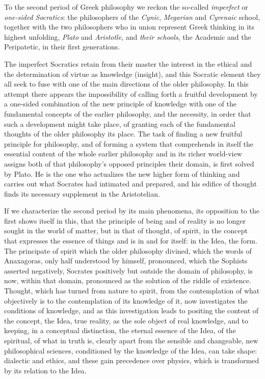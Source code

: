 To the second period of Greek philosophy we reckon the so-called \emph{imperfect} or \emph{one-sided Socratics}: the philosophers of the \emph{Cynic}, \emph{Megarian} and \emph{Cyrenaic} school, together with the two philosophers who in union represent Greek thinking in its highest unfolding, \emph{Plato} and \emph{Aristotle}, and \emph{their schools}, the Academic and the Peripatetic, in their first generations.

The imperfect Socratics retain from their master the interest in the ethical and the determination of virtue as knowledge (insight), and this Socratic element they all seek to fuse with one of the main directions of the older philosophy. In this attempt there appears the impossibility of calling forth a fruitful development by a one-sided combination of the new principle of knowledge with one of the fundamental concepts of the earlier philosophy, and the necessity, in order that such a development might take place, of granting each of the fundamental thoughts of the older philosophy its place. The task of finding a new fruitful principle for philosophy, and of forming a system that comprehends in itself the essential content of the whole earlier philosophy and in its richer world-view assigns both of that philosophy's opposed principles their domain, is first solved by Plato. He is the one who actualizes the new higher form of thinking and carries out what Socrates had intimated and prepared, and his edifice of thought finds its necessary supplement in the Aristotelian.

If we characterize the second period by its main phenomena, its opposition to the first shows itself in this, that the principle of being and of reality is no longer sought in the world of matter, but in that of thought, of spirit, in the concept that expresses the essence of things and is in and for itself: in the Idea, the form. The principate of spirit which the older philosophy divined, which the words of Anaxagoras, only half understood by himself, pronounced, which the Sophists asserted negatively, Socrates positively but outside the domain of philosophy, is now, within that domain, pronounced as the solution of the riddle of existence. Thought, which has turned from nature to spirit, from the contemplation of what objectively is to the contemplation of its knowledge of it, now investigates the conditions of knowledge, and as this investigation leads to positing the content of the concept, the Idea, true reality, as the sole object of real knowledge, and to keeping, in a conceptual distinction, the eternal essence of the Idea, of the spiritual, of what in truth is, clearly apart from the sensible and changeable, new philosophical sciences, conditioned by the knowledge of the Idea, can take shape: dialectic and ethics, and these gain precedence over physics, which is transformed by its relation to the Idea.

